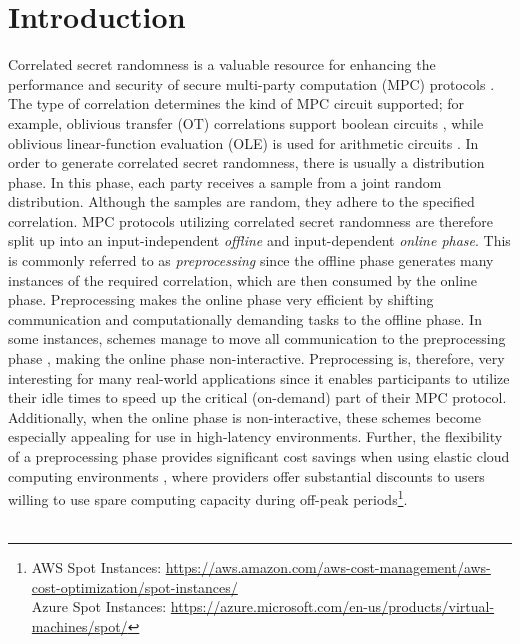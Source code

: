 \chapter{Introduction}
Correlated secret randomness is a valuable resource for enhancing the performance and security of secure multi-party computation (MPC) protocols \cite{ishai2013power}. The type of correlation determines the kind of MPC circuit supported; for example, oblivious transfer (OT) correlations support boolean circuits \cite{goldreich2019play}, while oblivious linear-function evaluation (OLE) is used for arithmetic circuits \cite{ishai2009secure}. In order to generate correlated secret randomness, there is usually a distribution phase. In this phase, each party receives a sample from a joint random distribution. Although the samples are random, they adhere to the specified correlation. MPC protocols utilizing correlated secret randomness are therefore split up into an input-independent \textit{offline} and input-dependent \textit{online phase}. This is commonly referred to as \textit{preprocessing} since the offline phase generates many instances of the required correlation, which are then consumed by the online phase. Preprocessing makes the online phase very efficient by shifting communication and computationally demanding tasks to the offline phase. In some instances, schemes manage to move all communication to the preprocessing phase \cite{abram2022low, faust2023non}, making the online phase non-interactive. Preprocessing is, therefore, very interesting for many real-world applications since it enables participants to utilize their idle times to speed up the critical (on-demand) part of their MPC protocol. Additionally, when the online phase is non-interactive, these schemes become especially appealing for use in high-latency environments. Further, the flexibility of a preprocessing phase provides significant cost savings when using elastic cloud computing environments \cite{coutinho2015elasticity}, where providers offer substantial discounts to users willing to use spare computing capacity during off-peak periods\footnote{AWS Spot Instances: \url{https://aws.amazon.com/aws-cost-management/aws-cost-optimization/spot-instances/} \\ Azure Spot Instances: \url{https://azure.microsoft.com/en-us/products/virtual-machines/spot/}}.
\\\\
